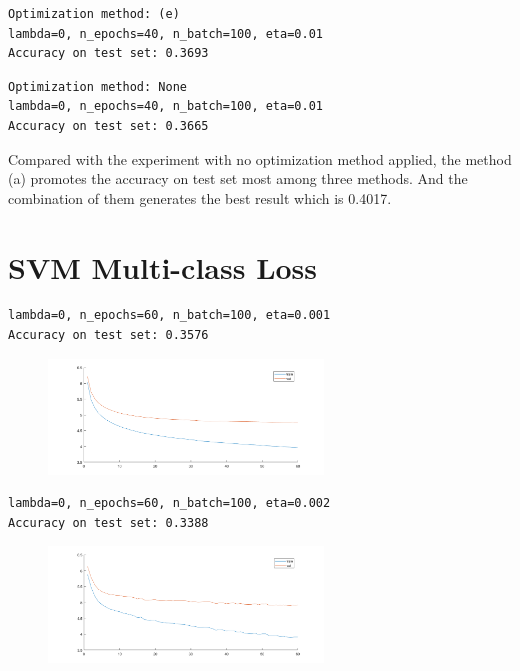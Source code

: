 \begin{verbatim}
Optimization method: (e)
lambda=0, n_epochs=40, n_batch=100, eta=0.01
Accuracy on test set: 0.3693
\end{verbatim}

\begin{verbatim}
Optimization method: None
lambda=0, n_epochs=40, n_batch=100, eta=0.01
Accuracy on test set: 0.3665
\end{verbatim}

Compared with the experiment with no optimization method applied, the method (a) promotes the accuracy on test set most among three methods. And the combination of them generates the best result which is 0.4017.

\newpage
\section{SVM Multi-class Loss}

\begin{verbatim}
lambda=0, n_epochs=60, n_batch=100, eta=0.001
Accuracy on test set: 0.3576
\end{verbatim}

\begin{figure}[h!]
	\centering
	\includegraphics[width=0.65\textwidth]{../Result_Pics/a6.png}
\end{figure}

\begin{verbatim}
lambda=0, n_epochs=60, n_batch=100, eta=0.002
Accuracy on test set: 0.3388
\end{verbatim}

\begin{figure}[h!]
	\centering
	\includegraphics[width=0.65\textwidth]{../Result_Pics/a7.png}
\end{figure}

